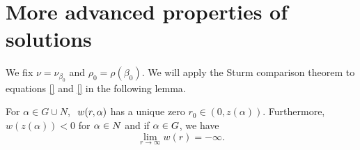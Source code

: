 \section{More advanced properties of solutions}
We fix $\nu = \nu_{\beta_0}$ and $\rho_0 = \rho \left( \beta_0 \right)$. We will
apply the Sturm comparison theorem to equations \eqref{} and \eqref{} in the 
following lemma.

\begin{lemma}\label{genlem6}
For $\alpha\in G\cup N$, $~w(r,\alpha)$ has a unique zero $r_0\in(0,z(\alpha)).$
Furthermore, \hfill\\ $w(z(\alpha))<0$ for $\alpha\in N$ and if $\alpha\in G$, we have
\[
\underset{r\to\infty}{\lim}w(r)=-\infty.
\]
\end{lemma}
